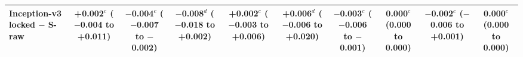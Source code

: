 \begin{tabular}{@{}lccccccccc@{}}
Inception-v3 locked $-$ S-raw & \makecell{+0.002$^{c}$\\{\scriptsize ($-$0.004 to +0.011)}} & \makecell{$-$0.004$^{c}$\\{\scriptsize ($-$0.007 to $-$0.002)}} & \makecell{$-$0.008$^{d}$\\{\scriptsize ($-$0.018 to +0.002)}} & \makecell{+0.002$^{c}$\\{\scriptsize ($-$0.003 to +0.006)}} & \makecell{+0.006$^{d}$\\{\scriptsize ($-$0.006 to +0.020)}} & \makecell{$-$0.003$^{c}$\\{\scriptsize ($-$0.006 to $-$0.001)}} & \makecell{0.000$^{c}$\\{\scriptsize (0.000 to 0.000)}} & \makecell{$-$0.002$^{c}$\\{\scriptsize ($-$0.006 to +0.001)}} & \makecell{0.000$^{c}$\\{\scriptsize (0.000 to 0.000)}} \\
\bottomrule
\end{tabular}

